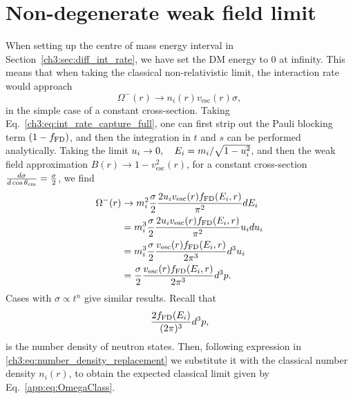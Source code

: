 \section{Non-degenerate weak field limit}
\label{app:sec:weakfieldlimit}


When setting up the centre of mass energy interval in Section~\ref{ch3:sec:diff_int_rate}, we have set the DM energy to 0 at infinity. This means that when taking the classical non-relativistic limit, the interaction rate would approach 
\begin{equation}
\Omega^{-}(r) \rightarrow n_i(r) v_\mathrm{esc}(r) \sigma, \label{app:eq:OmegaClass}
\end{equation}
in the simple case of a constant cross-section. Taking Eq.~\ref{ch3:eq:int_rate_capture_full}, one can first strip out the Pauli blocking term $(1-f_{\rm FD})$, and then the integration in $t$ and $s$ can be performed analytically. Taking the limit $u_i\rightarrow0, \quad E_i=m_i/\sqrt{1-u_i^2}$, and then the weak field approximation $B(r)\rightarrow1-v_\mathrm{esc}^2(r)$, for a constant cross-section $\frac{d\sigma}{d\cos\theta_\mathrm{cm}}=\frac{\sigma}{2}$, we find 
\begin{align}
\Omega^{-}(r) &\rightarrow m_i^2 \frac{\sigma}{2}\frac{2u_i v_\mathrm{esc}(r) f_{\rm FD}(E_i,r)}{\pi^2}dE_i \\
& = m_i^3 \frac{\sigma}{2} \frac{2u_i v_\mathrm{esc}(r)  f_{\rm FD}(E_i,r)}{\pi^2}u_i du_i  \\ 
&= m_i^3 \frac{\sigma}{2}\frac{v_\mathrm{esc}(r)  f_{\rm FD}(E_i,r)}{2\pi^3} d^3u_i \\
& = \frac{\sigma}{2} \frac{v_\mathrm{esc}(r)  f_{\rm FD}(E_i,r)}{2\pi^3} d^3p. 
\end{align}
Cases with $\sigma\propto t^n$ give similar results.
Recall that
\begin{equation}
    \frac{2f_{\rm FD}(E_i)}{(2\pi)^3} d^3p,
\end{equation}
is the number density of neutron states. Then, following expression in \ref{ch3:eq:number_density_replacement} we substitute it with the classical number density $n_i(r)$, to obtain the expected classical limit given by Eq.~\ref{app:eq:OmegaClass}. 




